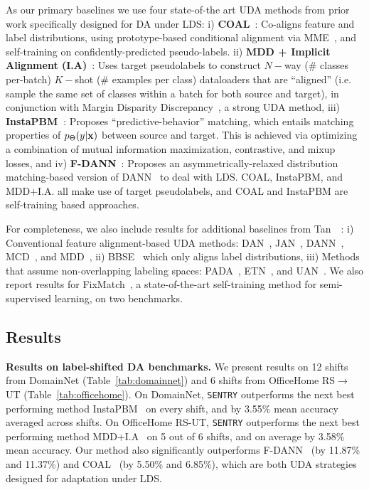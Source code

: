 \documentclass[10pt,twocolumn,letterpaper]{article}
\newcommand{\method}{\texttt{SENTRY}\xspace}
\begin{document}
\noindent As our primary baselines we use four state-of-the art UDA methods from prior work specifically designed for DA under LDS: i) \textbf{COAL}~\cite{tan2019generalized}: Co-aligns feature and label distributions, using prototype-based conditional alignment via MME~\cite{saito2019semi}, and self-training on confidently-predicted pseudo-labels. ii) \textbf{MDD + Implicit Alignment (I.A)}~\cite{jiang2020implicit}: Uses target pseudolabels to construct $N-$way (\# classes per-batch) $K-$shot (\# examples per class) dataloaders that are ``aligned'' (i.e. sample the same set of classes within a batch for both source and target), in conjunction with Margin Disparity Discrepancy~\cite{zhang2019bridging}, a strong UDA method, iii) \textbf{InstaPBM~\cite{li2020rethinking}}: Proposes ``predictive-behavior'' matching, which entails matching properties of $p_{\Theta}(y|\mathbf{x})$ between source and target. This is achieved via optimizing a combination of mutual information maximization, contrastive, and mixup losses, and iv) \textbf{F-DANN}~\cite{wu2019domain}: Proposes an asymmetrically-relaxed distribution matching-based version of DANN~\cite{ganin2014unsupervised} to deal with LDS. COAL, InstaPBM, and MDD+I.A. all make use of target pseudolabels, and COAL and InstaPBM are self-training based approaches.

For completeness, we also include results for additional baselines from Tan~\etal~\cite{tan2019generalized}: i) Conventional feature alignment-based UDA methods: DAN~\cite{long2015learning}, JAN~\cite{long2017deep}, DANN~\cite{ganin2014unsupervised}, MCD~\cite{saito2019semi}, and MDD~\cite{zhang2019bridging}, ii) BBSE~\cite{li2020rethinking} which only aligns label distributions, iii) Methods that assume non-overlapping labeling spaces: PADA~\cite{cao2018partial}, ETN~\cite{cao2019learning}, and UAN~\cite{you2019universal}. We also report results for FixMatch~\cite{sohn2020fixmatch}, a state-of-the-art self-training method for semi-supervised learning, on two benchmarks.


\vspace{-5pt}
\subsection{Results}
\label{ref:results}


\noindent \textbf{Results on label-shifted DA benchmarks.} We present results on 12 shifts from DomainNet (Table~\ref{tab:domainnet}) and 6 shifts from OfficeHome RS$\rightarrow$UT (Table~\ref{tab:officehome}). On DomainNet, \method outperforms the next best performing method InstaPBM~\cite{li2020rethinking} on every shift, and by 3.55\% mean accuracy averaged across shifts. On OfficeHome RS-UT, \method outperforms the next best performing method MDD+I.A~\cite{jiang2020implicit} on 5 out of 6 shifts, and on average by 3.58\% mean accuracy. Our method also significantly outperforms F-DANN~\cite{wu2019domain} (by 11.87\% and 11.37\%) and COAL~\cite{tan2019generalized} (by 5.50\% and 6.85\%), which are both UDA strategies designed for adaptation under LDS.
\end{document}
